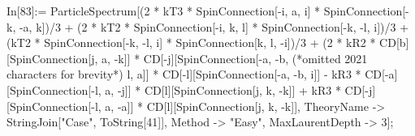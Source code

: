 In[83]:= ParticleSpectrum[(2 * kT3 * SpinConnection[-i, a, i] * SpinConnection[-k, -a, k])/3 + (2 * kT2 * SpinConnection[-i, k, l] * SpinConnection[-k, -l, i])/3 + (kT2 * SpinConnection[-k, -l, i] * SpinConnection[k, l, -i])/3 + (2 * kR2 * CD[b][SpinConnection[j, a, -k]] * CD[-j][SpinConnection[-a, -b, (*omitted 2021 characters for brevity*) l, a]] * CD[-l][SpinConnection[-a, -b, i]] - kR3 * CD[-a][SpinConnection[-l, a, -j]] * CD[l][SpinConnection[j, k, -k]] + kR3 * CD[-j][SpinConnection[-l, a, -a]] * CD[l][SpinConnection[j, k, -k]], TheoryName -> StringJoin["Case", ToString[41]], Method -> "Easy", MaxLaurentDepth -> 3];